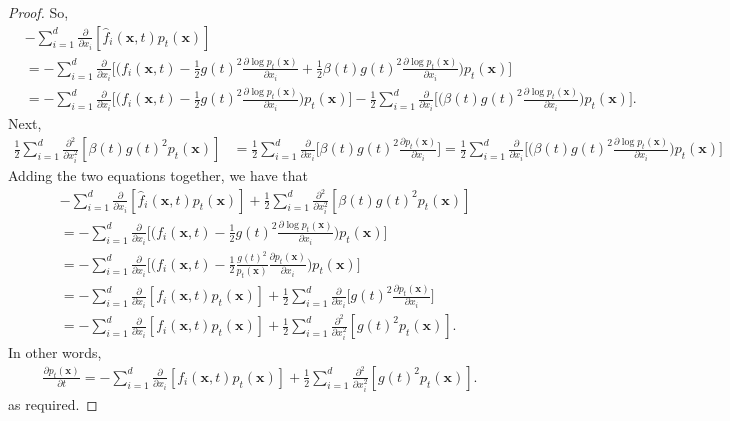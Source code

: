 \documentclass[10pt]{article}
\newcommand{\ve}[1]{\mathbf{#1}}
\begin{document}
\begin{itemize}
\begin{proof}
    So,
    \begin{align*}
      &-\sum_{i=1}^d \frac{\partial}{\partial x_i}[\hat{f}_i(\ve{x},t) p_t(\ve{x})] \\
      &= -\sum_{i=1}^d \frac{\partial}{\partial x_i}\bigg[ \bigg( f_i(\ve{x},t) - \frac{1}{2}g(t)^2 \frac{\partial \log p_t(\ve{x})}{\partial x_i} + \frac{1}{2}\beta(t) g(t)^2 \frac{\partial \log p_t(\ve{x})}{\partial x_i} \bigg) p_t(\ve{x}) \bigg] \\
      &= -\sum_{i=1}^d \frac{\partial}{\partial x_i}\bigg[ \bigg( f_i(\ve{x},t) - \frac{1}{2}g(t)^2 \frac{\partial \log p_t(\ve{x})}{\partial x_i}\bigg) p_t(\ve{x}) \bigg] - \frac{1}{2} \sum_{i=1}^d \frac{\partial}{\partial x_i}\bigg[ \bigg( \beta(t) g(t)^2 \frac{\partial \log p_t(\ve{x})}{\partial x_i} \bigg) p_t(\ve{x}) \bigg].
    \end{align*}
    Next,
    \begin{align*}
      \frac{1}{2} \sum_{i=1}^d \frac{\partial^2}{\partial x_i^2} [\beta(t) g(t)^2 p_t(\ve{x})]
      &= \frac{1}{2} \sum_{i=1}^d \frac{\partial}{\partial x_i} \bigg[\beta(t) g(t)^2 \frac{\partial p_t(\ve{x})}{\partial x_i}\bigg]
      = \frac{1}{2} \sum_{i=1}^d \frac{\partial}{\partial x_i} \bigg[ \bigg( \beta(t) g(t)^2 \frac{\partial \log p_t(\ve{x})}{\partial x_i}\bigg) p_t(\ve{x}) \bigg]
    \end{align*}
    Adding the two equations together, we have that
    \begin{align*}
      &-\sum_{i=1}^d \frac{\partial}{\partial x_i}[\hat{f}_i(\ve{x},t) p_t(\ve{x})] + \frac{1}{2} \sum_{i=1}^d \frac{\partial^2}{\partial x_i^2} [\beta(t) g(t)^2 p_t(\ve{x})] \\
      &= -\sum_{i=1}^d \frac{\partial}{\partial x_i}\bigg[ \bigg( f_i(\ve{x},t) - \frac{1}{2}g(t)^2 \frac{\partial \log p_t(\ve{x})}{\partial x_i}\bigg) p_t(\ve{x}) \bigg] \\
      &= -\sum_{i=1}^d \frac{\partial}{\partial x_i}\bigg[ \bigg( f_i(\ve{x},t) - \frac{1}{2}\frac{g(t)^2}{p_t(\ve{x})} \frac{\partial p_t(\ve{x})}{\partial x_i}\bigg) p_t(\ve{x}) \bigg] \\
      &= -\sum_{i=1}^d \frac{\partial}{\partial x_i}[ f_i(\ve{x},t) p_t(\ve{x}) ] + \frac{1}{2} \sum_{i=1}^d \frac{\partial}{\partial x_i}\bigg[ g(t)^2 \frac{\partial p_t(\ve{x})}{\partial x_i} \bigg] \\
      &= -\sum_{i=1}^d \frac{\partial}{\partial x_i}[ f_i(\ve{x},t) p_t(\ve{x}) ] + \frac{1}{2} \sum_{i=1}^d \frac{\partial^2}{\partial x_i^2}[ g(t)^2 p_t(\ve{x})].
    \end{align*}
    In other words,
    \begin{align*}
      \frac{\partial p_t(\ve{x})}{\partial t} = -\sum_{i=1}^d \frac{\partial}{\partial x_i}[ f_i(\ve{x},t) p_t(\ve{x}) ] + \frac{1}{2} \sum_{i=1}^d \frac{\partial^2}{\partial x_i^2}[ g(t)^2 p_t(\ve{x})].
    \end{align*}
    as required.
  \end{proof}


\end{itemize}
\end{document}
